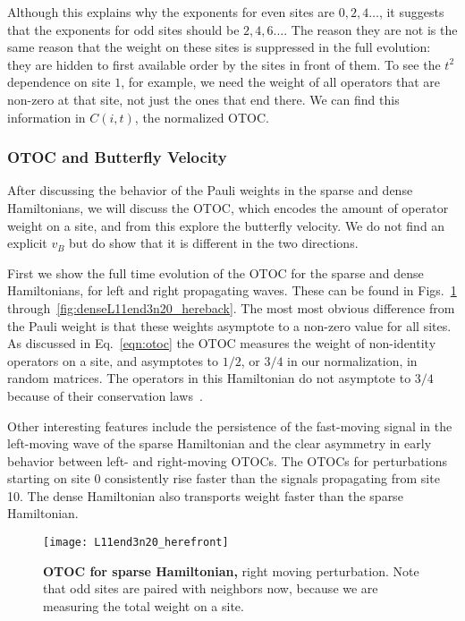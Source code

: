 Although this explains why the exponents for even sites are $0,2,4\dots$, it suggests that the exponents for odd sites should be $2,4,6\dots$. The reason they are not is the same reason that the weight on these sites is suppressed in the full evolution: they are hidden to first available order by the sites in front of them. To see the $t^2$ dependence on site $1$, for example, we need the weight of all operators that are non-zero at that site, not just the ones that end there. We can find this information in $C(i,t)$, the normalized OTOC.

\subsubsection{OTOC and Butterfly Velocity} \label{subsub:otoc}

After discussing the behavior of the Pauli weights in the sparse and dense Hamiltonians, we will discuss the OTOC, which encodes the amount of operator weight on a site, and from this explore the butterfly velocity. We do not find an explicit $v_B$ but do show that it is different in the two directions. 

First we show the full time evolution of the OTOC for the sparse and dense Hamiltonians, for left and right propagating waves. These can be found in Figs.~\ref{fig:L11end3n20_herefront} through~\ref{fig:denseL11end3n20_hereback}. The most most obvious difference from the Pauli weight is that these weights asymptote to a non-zero value for all sites. As discussed in Eq.~\ref{eqn:otoc} the OTOC measures the weight of non-identity operators on a site, and asymptotes to $1/2$, or $3/4$ in our normalization, in random matrices. The operators in this Hamiltonian do not asymptote to $3/4$ because of their conservation laws~\cite{Jonay17, Jonay18}.

Other interesting features include the persistence of the fast-moving signal in the left-moving wave of the sparse Hamiltonian and the clear asymmetry in early behavior between left- and right-moving OTOCs. The OTOCs for perturbations starting on site 0 consistently rise faster than the signals propagating from site 10. The dense Hamiltonian also transports weight faster than the sparse Hamiltonian.

\begin{figure}
	\centering
	\texttt{[image: L11end3n20\_herefront]}
	\caption{\textbf{OTOC for sparse Hamiltonian,} right moving perturbation. Note that odd sites are paired with neighbors now, because we are measuring the total weight on a site.}
	\label{fig:L11end3n20_herefront}
\end{figure}

